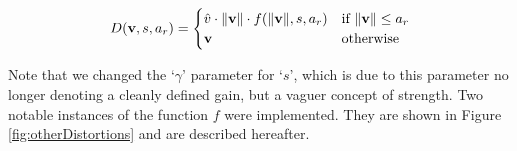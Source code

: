\begin{equation}
    \label{eq:distortionCase}
    D(\mathbf{v}, s, a_r) =
    \begin{cases}
        \hat{v} \cdot \lVert\mathbf{v}\rVert \cdot f(\lVert\mathbf{v}\rVert, s, a_r)    &\text{if } \lVert\mathbf{v}\rVert \leq a_r\\
        \mathbf{v}                                                         &\text{otherwise}
    \end{cases}
\end{equation}

Note that we changed the `$\gamma $' parameter for `$s$', which is due to this parameter no longer denoting a cleanly defined gain, but a vaguer concept of strength. Two notable instances of the function $f$ were implemented. They are shown in Figure \ref{fig:otherDistortions} and are described hereafter.

